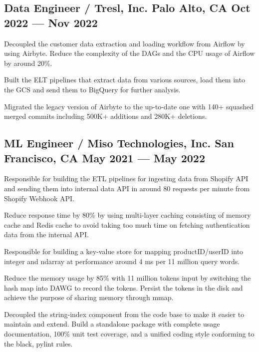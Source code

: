 \subsection{{Data Engineer / Tresl, Inc. \hfill Palo Alto, CA \> Oct 2022 --- Nov 2022}}
\begin{zitemize}
\item Decoupled the customer data extraction and loading workflow from Airflow by using Airbyte. Reduce the complexity of the DAGs and the CPU usage of Airflow by around 20\%.
\item Built the ELT pipelines that extract data from various sources, load them into the GCS and send them to BigQuery for further analysis.
\item Migrated the legacy version of Airbyte to the up-to-date one with 140+ squashed merged commits including 500K+ additions and 280K+ deletions.
\end{zitemize}


\subsection{{ML Engineer / Miso Technologies, Inc.  \hfill San Francisco, CA \> May 2021 --- May 2022}}

\begin{zitemize}
\item Responsible for building the ETL pipelines for ingesting data from Shopify API and sending them into internal data API in around 80 requests per minute from Shopify Webhook API.
\item Reduce response time by 80\% by using multi-layer caching consisting of memory cache and Redis cache to avoid taking too much time on fetching authentication data from the internal API.
\end{zitemize}


\begin{zitemize}
\item Responsible for building a key-value store for mapping productID/userID into integer and ndarray at performance around 4 ms per 11 million query words.
\item Reduce the memory usage by 85\% with 11 million tokens input by switching the hash map into DAWG to record the tokens. Persist the tokens in the disk and achieve the purpose of sharing memory through mmap.
\item Decoupled the string-index component from the code base to make it easier to maintain and extend. Build a standalone package with complete usage documentation, 100\% unit test coverage, and a unified coding style conforming to the black, pylint rules.
\end{zitemize}

